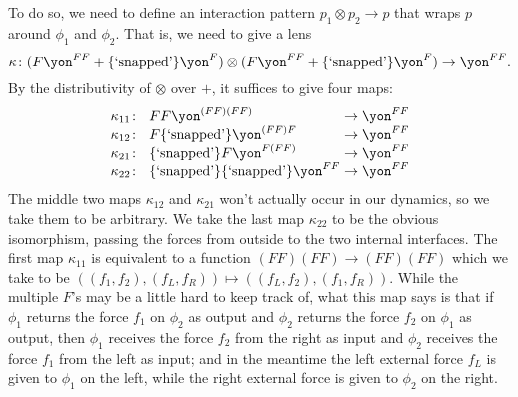 \documentclass[Book-Poly]{subfiles}
\begin{document}
\begin{example}
To do so, we need to define an interaction pattern $p_1\otimes p_2\to p$ that wraps $p$ around $\phi_1$ and $\phi_2$.
That is, we need to give a lens
\[
    \kappa\colon (F\yon^{FF}+\{\text{`snapped'}\}\yon^F)\otimes (F\yon^{FF}+\{\text{`snapped'}\}\yon^F)\to\yon^{FF}.
\]
By the distributivity of $\otimes$ over $+$, it suffices to give four maps:
\begin{equation}\label{eqn.snapped_maps}
\arraycolsep=1.4pt
\begin{array}{lll}
	\kappa_{11}\colon&~ FF\yon^{(FF)(FF)}&\to\yon^{FF}\\
	\kappa_{12}\colon&~ F\{\text{`snapped'}\}\yon^{(FF)F}&\to\yon^{FF}\\
	\kappa_{21}\colon&~ \{\text{`snapped'}\}F\yon^{F(FF)}&\to\yon^{FF}\\
	\kappa_{22}\colon&~ \{\text{`snapped'}\}\{\text{`snapped'}\}\yon^{FF}&\to\yon^{FF}
\end{array}
\end{equation}
The middle two maps $\kappa_{12}$ and $\kappa_{21}$ won't actually occur in our dynamics, so we take them to be arbitrary.
We take the last map $\kappa_{22}$ to be the obvious isomorphism, passing the forces from outside to the two internal interfaces.
The first map $\kappa_{11}$ is equivalent to a function $(FF)(FF)\to (FF)(FF)$ which we take to be $((f_1,f_2),(f_L,f_R))\mapsto((f_L,f_2),(f_1,f_R))$.
While the multiple $F$'s may be a little hard to keep track of, what this map says is that if $\phi_1$ returns the force $f_1$ on $\phi_2$ as output and $\phi_2$ returns the force $f_2$ on $\phi_1$ as output, then $\phi_1$ receives the force $f_2$ from the right as input and $\phi_2$ receives the force $f_1$ from the left as input; and in the meantime the left external force $f_L$ is given to $\phi_1$ on the left, while the right external force is given to $\phi_2$ on the right.


\end{example}
\end{document}

